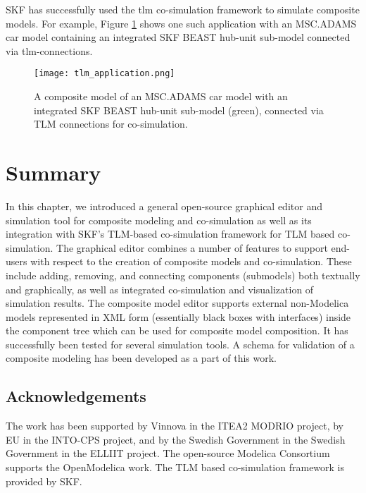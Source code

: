 SKF has successfully used the \acrshort{tlm} co-simulation framework to simulate composite models. For
example, Figure \ref{fig:tlmapplication} shows one such application with an MSC.ADAMS \cite{adams} car model
containing an integrated SKF BEAST\cite{beast} hub-unit sub-model 
connected via \acrshort{tlm}-connections.

\begin{figure}
	\texttt{[image: tlm\_application.png]}
	\caption{A composite model of an MSC.ADAMS car model with an integrated SKF BEAST hub-unit sub-model (green), connected 
		     via TLM connections for co-simulation.}
	\label{fig:tlmapplication}
\end{figure}

\section{Summary}
\label{sec:tlmsummary}

In this chapter, we introduced a general open-source graphical editor and simulation tool for composite modeling and co-simulation as well as its integration with SKF’s TLM-based co-simulation framework for TLM based co-simulation. The graphical editor combines a number of features to support end-users with respect to the creation of composite models and co-simulation. These include adding, removing, and connecting components (submodels) both textually and graphically, as well as integrated co-simulation and visualization of simulation results. The composite model editor supports external non-Modelica models represented in XML form (essentially black boxes with interfaces) inside the component tree which can be used for composite model composition. It has successfully been tested for several simulation tools. A schema for validation of a composite modeling has been developed as a part of this work. 

\subsection*{Acknowledgements}
\label{sec:tlmAcknowledgements}

The work has been supported by Vinnova in the ITEA2
MODRIO project, by EU in the INTO-CPS project, and by the Swedish Government in the Swedish
Government in the ELLIIT project. The open-source Modelica Consortium supports the OpenModelica
work. The TLM based co-simulation framework is provided by SKF.





